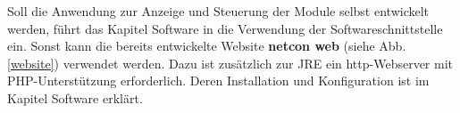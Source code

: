 \documentclass[a4paper,14pt,headsepline]{scrartcl}
\begin{document}
\begin{figure}[h]
\begin{center}
\end{center}
\end{figure}

\newpage
Soll die Anwendung zur Anzeige und Steuerung der Module selbst entwickelt werden, führt das Kapitel Software in die Verwendung der Softwareschnittstelle ein. Sonst kann die bereits entwickelte Website \textbf{netcon web} (siehe Abb. \ref{website}) verwendet werden. Dazu ist zusätzlich zur JRE ein http-Webserver mit PHP-Unterstützung erforderlich. Deren Installation und Konfiguration ist im Kapitel Software erklärt. 

\begin{figure}[h]
\begin{center}
\end{center}
\end{figure}
\end{document}
